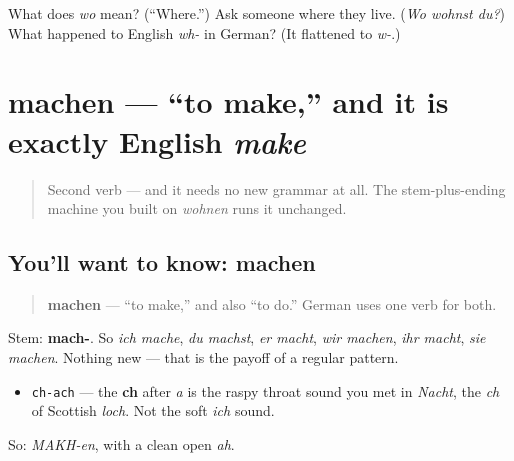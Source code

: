 \begin{tcolorbox}[breakable,colback=teal!4,colframe=teal!35!black,title={Before you move on}]
What does \emph{wo} mean? (\textquotedblleft{}Where.\textquotedblright{}) Ask someone where they live. (\emph{Wo wohnst du?}) What happened to English \emph{wh-} in German? (It flattened to \emph{w-}.)
\end{tcolorbox}
\section[machen]{machen — \textquotedblleft{}to make,\textquotedblright{} and it is exactly English \emph{make}}

\label{lesson:GE-C05-machen}



\begin{quote}
Second verb — and it needs no new grammar at all. The stem-plus-ending machine you built on \emph{wohnen} runs it unchanged.
\end{quote}

\subsection*{You'll want to know: machen}
\begin{quote}
\textbf{machen} — \textquotedblleft{}to make,\textquotedblright{} and also \textquotedblleft{}to do.\textquotedblright{} German uses one verb for both.
\end{quote}

Stem: \textbf{mach-}. So \emph{ich mache}, \emph{du machst}, \emph{er macht}, \emph{wir machen}, \emph{ihr macht}, \emph{sie machen}. Nothing new — that is the payoff of a regular pattern.

\begin{sounds}
\begin{itemize}
\raggedright
  \item \texttt{ch-ach} — the \textbf{ch} after \emph{a} is the raspy throat sound you met in \emph{Nacht}, the \emph{ch} of Scottish \emph{loch}. Not the soft \emph{ich} sound.
\end{itemize}

So: \emph{MAKH-en}, with a clean open \emph{ah}.
\end{sounds}

